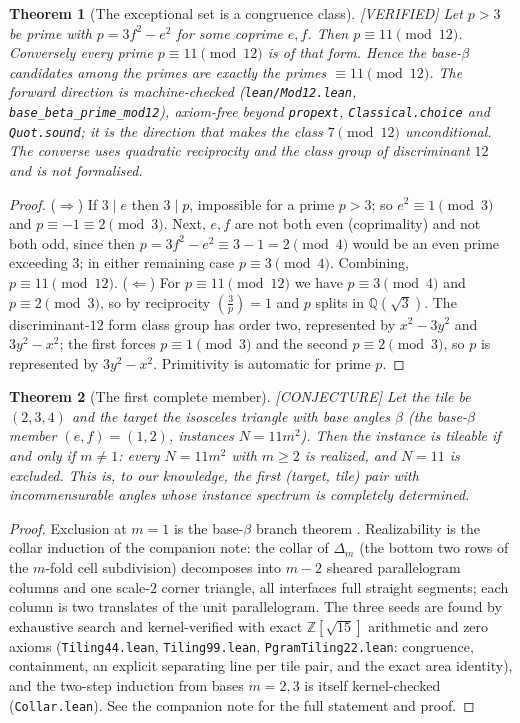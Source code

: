 \documentclass[11pt,reqno]{amsart}
\theoremstyle{plain}
\newtheorem{theorem}{Theorem}
\theoremstyle{definition}
\newcommand{\Z}{\mathbb{Z}}
\newcommand{\Q}{\mathbb{Q}}
\newcommand{\lab}[1]{\hfill\textnormal{\footnotesize\textsc{[#1]}}}
\begin{document}
\begin{theorem}[The exceptional set is a congruence class]\label{thm:mod12}\lab{VERIFIED}
Let $p>3$ be prime with $p=3f^2-e^2$ for some coprime $e,f$. Then $p\equiv11\pmod{12}$. Conversely
every prime $p\equiv11\pmod{12}$ is of that form. Hence the base-$\beta$ candidates among the primes
are exactly the primes $\equiv11\pmod{12}$.
The forward direction is machine-checked
(\texttt{lean/Mod12.lean}, \texttt{base\_beta\_prime\_mod12}), axiom-free beyond \texttt{propext},
\texttt{Classical.choice} and \texttt{Quot.sound}; it is the direction that makes the class
$7\pmod{12}$ unconditional. The converse uses quadratic reciprocity and the class group of
discriminant $12$ and is not formalised.
\end{theorem}

\begin{proof}
($\Rightarrow$) If $3\mid e$ then $3\mid p$, impossible for a prime $p>3$; so $e^2\equiv1\pmod 3$ and
$p\equiv-1\equiv2\pmod3$. Next, $e,f$ are not both even (coprimality) and not both odd, since then
$p=3f^2-e^2\equiv3-1=2\pmod4$ would be an even prime exceeding $3$; in either remaining case
$p\equiv3\pmod4$. Combining, $p\equiv11\pmod{12}$.
($\Leftarrow$) For $p\equiv11\pmod{12}$ we have $p\equiv3\pmod4$ and $p\equiv2\pmod3$, so by
reciprocity $\left(\frac3p\right)=1$ and $p$ splits in $\Q(\sqrt3)$. The discriminant-$12$ form class
group has order two, represented by $x^2-3y^2$ and $3y^2-x^2$; the first forces $p\equiv1\pmod3$ and
the second $p\equiv2\pmod3$, so $p$ is represented by $3y^2-x^2$. Primitivity is automatic for
prime $p$.
\end{proof}

\begin{theorem}[The first complete member]\label{thm:realize12}\lab{CONJECTURE}
Let the tile be $(2,3,4)$ and the target the isosceles triangle with base angles $\beta$
(the base-$\beta$ member $(e,f)=(1,2)$, instances $N=11m^2$). Then the instance is tileable if and
only if $m\ne1$: every $N=11m^2$ with $m\ge2$ is realized, and $N=11$ is excluded. This is, to our
knowledge, the first (target, tile) pair with incommensurable angles whose instance spectrum is
completely determined.
\end{theorem}
\begin{proof}
Exclusion at $m=1$ is the base-$\beta$ branch theorem \cite{Companion}. Realizability is the collar
induction of the companion note: the collar of $\Delta_m$ (the bottom two rows of the $m$-fold cell
subdivision) decomposes into $m-2$ sheared parallelogram columns and one scale-$2$ corner triangle,
all interfaces full straight segments; each column is two translates of the unit parallelogram. The
three seeds are found by exhaustive search and kernel-verified with exact $\Z[\sqrt{15}]$
arithmetic and zero axioms (\texttt{Tiling44.lean}, \texttt{Tiling99.lean},
\texttt{PgramTiling22.lean}: congruence, containment, an explicit separating line per tile pair,
and the exact area identity), and the two-step induction from bases $m=2,3$ is itself
kernel-checked (\texttt{Collar.lean}). See the companion note \cite{Companion} for the full
statement and proof.
\end{proof}
\end{document}
